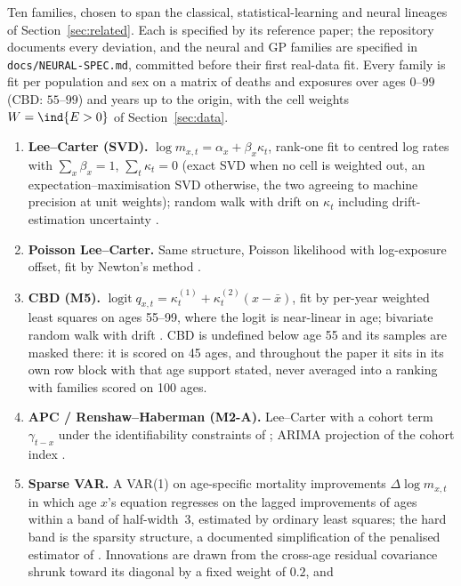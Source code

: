 Ten families, chosen to span the classical, statistical-learning and neural
lineages of Section~\ref{sec:related}. Each is specified by its reference
paper; the repository documents every deviation, and the neural and GP
families are specified in \texttt{docs/NEURAL-SPEC.md}, committed before
their first real-data fit. Every family is fit per population and sex on a
matrix of deaths and exposures over ages $0$--$99$ (CBD: $55$--$99$) and
years up to the origin, with the cell weights $W=\ind\{E>0\}$ of
Section~\ref{sec:data}.

\begin{enumerate}
\item \textbf{Lee--Carter (SVD).} $\log m_{x,t}=\alpha_x+\beta_x\kappa_t$,
  rank-one fit to centred log rates with $\sum_x\beta_x=1$,
  $\sum_t\kappa_t=0$ (exact SVD when no cell is weighted out, an
  expectation--maximisation SVD otherwise, the two agreeing to machine
  precision at unit weights); random walk with drift on $\kappa_t$
  including drift-estimation uncertainty \citep{lee1992modeling}.
\item \textbf{Poisson Lee--Carter.} Same structure, Poisson likelihood with
  log-exposure offset, fit by Newton's method \citep{brouhns2002poisson}.
\item \textbf{CBD (M5).} $\operatorname{logit} q_{x,t} = \kappa^{(1)}_t +
  \kappa^{(2)}_t (x-\bar x)$, fit by per-year weighted least squares on
  ages 55--99, where the logit is near-linear in age; bivariate random walk
  with drift \citep{cairns2006two}. CBD is undefined below age 55 and its
  samples are masked there: it is scored on 45 ages, and throughout the
  paper it sits in its own row block with that age support stated, never
  averaged into a ranking with families scored on 100 ages.
\item \textbf{APC / Renshaw--Haberman (M2-A).} Lee--Carter with a cohort term
  $\gamma_{t-x}$ under the identifiability constraints of
  \citet{cairns2009quantitative}; ARIMA projection of the cohort index
  \citep{renshaw2006cohort}.
\item \textbf{Sparse VAR.} A VAR(1) on age-specific mortality improvements
  $\Delta\log m_{x,t}$ in which age $x$'s equation regresses on the lagged
  improvements of ages within a band of half-width~3, estimated by
  ordinary least squares; the hard band is the sparsity structure, a
  documented simplification of the penalised estimator of
  \citet{li2017coherent}. Innovations are drawn from the cross-age residual
  covariance shrunk toward its diagonal by a fixed weight of $0.2$, and

\end{enumerate}
